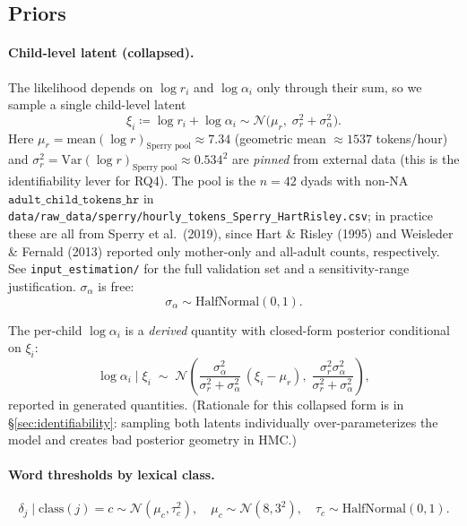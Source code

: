 \documentclass[11pt]{article}
\newcommand{\Var}{\mathrm{Var}}
\newcommand{\Norm}{\mathcal{N}}
\newcommand{\HN}{\mathrm{HalfNormal}}
\begin{document}
\subsection{Priors}

\paragraph{Child-level latent (collapsed).}
The likelihood depends on \(\log r_i\) and \(\log \alpha_i\) only through
their sum, so we sample a single child-level latent
\[ \xi_i \coloneqq \log r_i + \log \alpha_i \sim \Norm\!\big(\mu_r,\; \sigma_r^2 + \sigma_\alpha^2\big). \]
Here \(\mu_r = \mathrm{mean}(\log r)_{\text{Sperry pool}} \approx 7.34\)
(geometric mean \(\approx 1537\) tokens/hour) and
\(\sigma_r^2 = \Var(\log r)_{\text{Sperry pool}} \approx 0.534^2\) are
\emph{pinned} from external data (this is the identifiability lever
for RQ4). The pool is the \(n=42\) dyads with non-NA
\(\texttt{adult\_child\_tokens\_hr}\) in
\texttt{data/raw\_data/sperry/hourly\_tokens\_Sperry\_HartRisley.csv}; in
practice these are all from Sperry et al.\ (2019), since Hart \& Risley
(1995) and Weisleder \& Fernald (2013) reported only mother-only and
all-adult counts, respectively. See \texttt{input\_estimation/} for the
full validation set and a sensitivity-range justification.
\(\sigma_\alpha\) is free:
\begin{equation}
\sigma_\alpha \sim \HN(0, 1).
\end{equation}

The per-child \(\log \alpha_i\) is a \emph{derived} quantity with closed-form
posterior conditional on \(\xi_i\):
\[
\log \alpha_i \mid \xi_i \;\sim\;
\Norm\!\left(\frac{\sigma_\alpha^2}{\sigma_r^2 + \sigma_\alpha^2}\,(\xi_i - \mu_r),
\;\frac{\sigma_r^2 \sigma_\alpha^2}{\sigma_r^2 + \sigma_\alpha^2}\right),
\]
reported in generated quantities. (Rationale for this collapsed form is
in \S\ref{sec:identifiability}: sampling both latents individually
over-parameterizes the model and creates bad posterior geometry in HMC.)

\paragraph{Word thresholds by lexical class.}
\begin{equation}
\delta_j \mid \mathrm{class}(j) = c \sim \Norm(\mu_c, \tau_c^2),
\quad \mu_c \sim \Norm(8, 3^2), \quad \tau_c \sim \HN(0, 1).
\end{equation}
\end{document}

